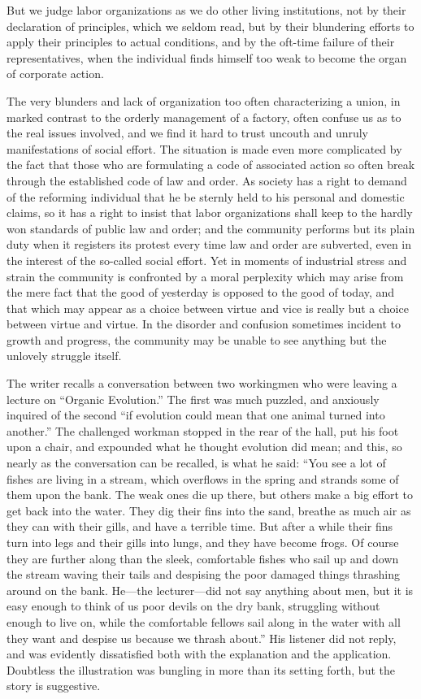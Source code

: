\documentclass[]{article}
\begin{document}
\begin{sectionbody}
\addamsparagraph But we judge labor organizations as we do other living institutions, not
by their declaration of principles, which we seldom read, but by their
blundering efforts to apply their principles to actual conditions, and
by the oft-time failure of their representatives, when the individual
finds himself too weak to become the organ of corporate action.

\addamsparagraph The very blunders and lack of organization too often characterizing a
union, in marked contrast to the orderly management of a factory, often
confuse us as to the real issues involved, and we find it hard to trust
uncouth and unruly manifestations of social effort. The situation is
made even more complicated by the fact that those who are formulating a
code of associated action so often break through the established code of
law and order. As society has a right to demand of the reforming
individual that he be sternly held to his personal and domestic claims,
so it has a right to insist that labor organizations shall keep to the
hardly won standards of public law and order; and the community performs
but its plain duty when it registers its protest every time law and
order are subverted, even in the interest of the so-called social
effort. Yet in moments of industrial stress and strain the community is
confronted by a moral perplexity which may arise from the mere fact that
the good of yesterday is opposed to the good of today, and that which
may appear as a choice between virtue and vice is really but a choice
between virtue and virtue. In the disorder and confusion sometimes
incident to growth and progress, the community may be unable to see
anything but the unlovely struggle itself.

\addamsparagraph The writer recalls a conversation between two workingmen who were
leaving a lecture on ``Organic Evolution.'' The first was much puzzled,
and anxiously inquired of the second ``if evolution could mean that one
animal turned into another.'' The challenged workman stopped in the rear
of the hall, put his foot upon a chair, and expounded what he thought
evolution did mean; and this, so nearly as the conversation can be
recalled, is what he said: ``You see a lot of fishes are living in a
stream, which overflows in the spring and strands some of them upon the
bank. The weak ones die up there, but others make a big effort to get
back into the water. They dig their fins into the sand, breathe as much
air as they can with their gills, and have a terrible time. But after a
while their fins turn into legs and their gills into lungs, and they
have become frogs. Of course they are further along than the sleek,
comfortable fishes who sail up and down the stream waving their tails
and despising the poor damaged things thrashing around on the bank.
He---the lecturer---did not say anything about men, but it is easy enough
to think of us poor devils on the dry bank, struggling without enough to
live on, while the comfortable fellows sail along in the water with all
they want and despise us because we thrash about.'' His listener did not
reply, and was evidently dissatisfied both with the explanation and the
application. Doubtless the illustration was bungling in more than its
setting forth, but the story is suggestive.


\end{sectionbody}
\end{document}
